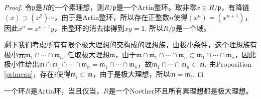 \begin{proof}
	令$\mathfrak{p}$是$R$的一个素理想，则$R/\mathfrak{p}$是一个Artin整环。取非零$x\in R/\mathfrak{p}$，有降链$(x)\supset (x^2)\cdots$，由于是Artin整环，所以存在正整数$n$使得$(x^n)=(x^{n+1})$，因此$x^n=x^{n+1}y$，由整环的消去律得到$xy=1$. 所以$R/\mathfrak{p}$是一个域。

	剩下我们考虑所有有限个极大理想的交构成的理想族，由极小条件，这个理想族有极小元$\mathfrak{m}_1\cap \cdots \cap \mathfrak{m}_n$. 任取极大理想$\mathfrak{m}$，由于$\mathfrak{m}\cap\mathfrak{m}_1\cap \cdots \cap \mathfrak{m}_n\subset \mathfrak{m}_1\cap \cdots \cap \mathfrak{m}_n$，因此极小性给出$\mathfrak{m}\cap\mathfrak{m}_1\cap \cdots \cap \mathfrak{m}_n=\mathfrak{m}_1\cap \cdots \cap \mathfrak{m}_n$，故$\mathfrak{m}_1\cap \cdots \cap \mathfrak{m}_n\subset \mathfrak{m}$. 由Proposition \ref{primeau}，存在$i$使得$\mathfrak{m}_i\subset \mathfrak{m}$，由于是极大理想，所以$\mathfrak{m}=\mathfrak{m}_i$.
\end{proof}

\begin{pro}\label{pro:3.4.16}
一个环$R$是Artin环，当且仅当，$R$是一个Noether环且所有素理想都是极大理想。
\end{pro}

